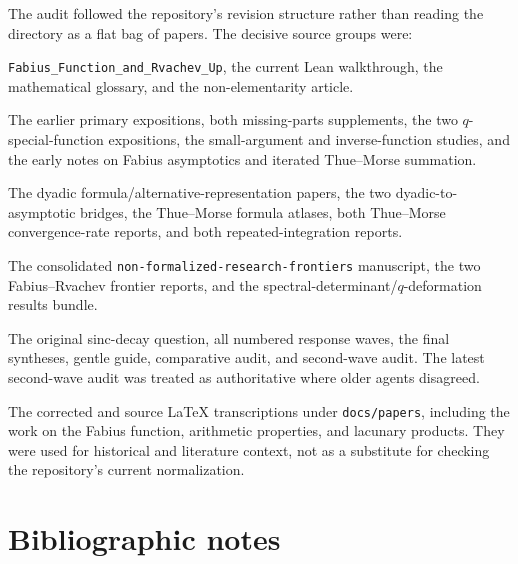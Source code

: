 \documentclass[11pt]{article}
\numberwithin{equation}{section}
\theoremstyle{definition}
\theoremstyle{remark}
\begin{document}
The audit followed the repository's revision structure rather than reading the
directory as a flat bag of papers.  The decisive source groups were:
\begin{description}[style=nextline,leftmargin=2.2em,labelindent=0pt]
\item[Current expository core.]
\texttt{Fabius\_Function\_and\_Rvachev\_Up}, the current Lean walkthrough,
the mathematical glossary, and the non-elementarity article.

\item[Archived foundational studies.]
The earlier primary expositions, both missing-parts supplements, the two
$q$-special-function expositions, the small-argument and inverse-function
studies, and the early notes on Fabius asymptotics and iterated Thue--Morse
summation.

\item[Exact arithmetic and convergence studies.]
The dyadic formula/alternative-representation papers, the two
dyadic-to-asymptotic bridges, the Thue--Morse formula atlases, both
Thue--Morse convergence-rate reports, and both repeated-integration reports.

\item[Live frontier synthesis.]
The consolidated \texttt{non-formalized-research-frontiers} manuscript, the two
Fabius--Rvachev frontier reports, and the spectral-determinant/$q$-deformation
results bundle.

\item[Fourier-decay campaign.]
The original sinc-decay question, all numbered response waves, the final
syntheses, gentle guide, comparative audit, and second-wave audit.  The latest
second-wave audit was treated as authoritative where older agents disagreed.

\item[Reference transcriptions.]
The corrected and source \LaTeX{} transcriptions under \texttt{docs/papers},
including the work on the Fabius function, arithmetic properties, and lacunary
products.  They were used for historical and literature context, not as a
substitute for checking the repository's current normalization.
\end{description}

\section{Bibliographic notes}
\end{document}
